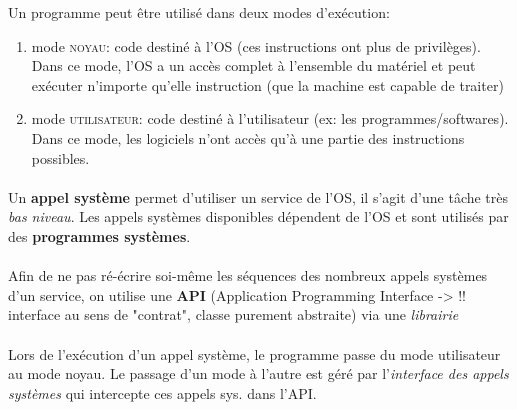 {
Un programme peut être utilisé dans deux modes d'exécution:
\begin{enumerate}
\item mode \textcolor{ltred}{\textsc{noyau}}: code destiné à l'OS (ces instructions ont plus de privilèges). Dans ce mode, l'OS a un accès complet à l'ensemble du matériel et peut exécuter n'importe qu'elle instruction (que la machine est capable de traiter)
\item mode \textcolor{ltred}{\textsc{utilisateur}}: code destiné à l'utilisateur (ex: les programmes/softwares). Dans ce mode, les logiciels n'ont accès qu'à une partie des instructions possibles.
\end{enumerate}


\paragraph{}
Un \textbf{appel système} permet d'utiliser un service de l'OS, il s'agit d'une tâche très \textit{bas niveau}. Les appels systèmes disponibles dépendent de l'OS et sont utilisés par des \textbf{programmes systèmes}.

\paragraph{}
Afin de ne pas ré-écrire soi-même les séquences des nombreux appels systèmes d'un service, on utilise une \textbf{API} (Application Programming Interface -> !! interface au sens de "contrat", classe purement abstraite) via une \textit{librairie}
\paragraph{}
Lors de l'exécution d'un appel système, le programme passe du mode utilisateur au mode noyau. Le passage d'un mode à l'autre est géré par l'\textit{interface des appels systèmes} qui intercepte ces appels sys. dans l'API.
}
